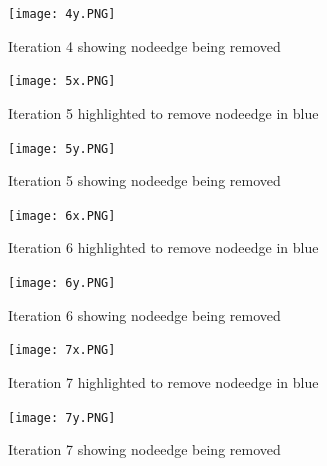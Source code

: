 \documentclass[12pt]{article}
\begin{document}
\begin{figure}[h]
    \centering
    \texttt{[image: 4y.PNG]}
    \caption{Iteration 4 showing nodeedge being removed}
    \label{fig:web-growth}
\end{figure}

\begin{figure}[h]
    \centering
    \texttt{[image: 5x.PNG]}
    \caption{Iteration 5 highlighted to remove nodeedge in blue}
    \label{fig:web-growth}
\end{figure}

\begin{figure}[h]
    \centering
    \texttt{[image: 5y.PNG]}
    \caption{Iteration 5 showing nodeedge being removed}
    \label{fig:web-growth}
\end{figure}

\begin{figure}[h]
    \centering
    \texttt{[image: 6x.PNG]}
    \caption{Iteration 6 highlighted to remove nodeedge in blue}
    \label{fig:web-growth}
\end{figure}

\begin{figure}[h]
    \centering
    \texttt{[image: 6y.PNG]}
    \caption{Iteration 6 showing nodeedge being removed}
    \label{fig:web-growth}
\end{figure}

\begin{figure}[h]
    \centering
    \texttt{[image: 7x.PNG]}
    \caption{Iteration 7 highlighted to remove nodeedge in blue}
    \label{fig:web-growth}
\end{figure}

\begin{figure}[h]
    \centering
    \texttt{[image: 7y.PNG]}
    \caption{Iteration 7 showing nodeedge being removed}
    \label{fig:web-growth}
\end{figure}
\end{document}

